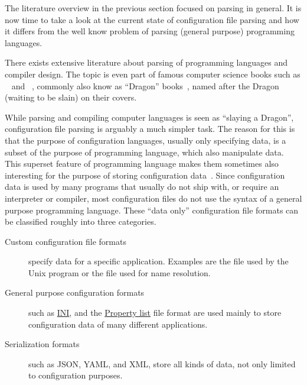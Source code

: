 The literature overview in the previous section focused on parsing in general. It is now time to take a look at the current state of configuration file parsing and how it differs from the well know problem of parsing (general purpose) programming languages.

There exists extensive literature about parsing of programming languages and compiler design. The topic is even part of famous computer science books such as ~\cite{ullman1977principles} and ~\cite{aho2006compilers}, commonly also know as “Dragon” books~\cite{parr2009language}, named after the Dragon (waiting to be slain) on their covers.

While parsing and compiling computer languages is seen as “slaying a Dragon”, configuration file parsing is arguably a much simpler task. The reason for this is that the purpose of configuration languages, usually only specifying data, is a subset of the purpose of programming language, which also manipulate data. This superset feature of programming language makes them sometimes also interesting for the purpose of storing configuration data~\cite{balmer2013lua}. Since configuration data is used by many programs that usually do not ship with, or require an interpreter or compiler, most configuration files do not use the syntax of a general purpose programming language. These “data only” configuration file formats can be classified roughly into three categories.

\begin{description}
  \item[Custom configuration file formats] specify data for a specific application. Examples are the \href{https://en.wikipedia.org/wiki/Fstab}{} file used by the Unix program  or the \href{https://en.wikipedia.org/wiki/https://en.wikipedia.org/wiki/Hosts_file}{} file used for name resolution.

  \item[General purpose configuration formats] such as \href{https://en.wikipedia.org/wiki/INI_file}{INI}, and the \href{https://en.wikipedia.org/wiki/Property_list}{Property list} file format are used mainly to store configuration data of many different applications.

  \item[Serialization formats] such as \gls{JSON}, \gls{YAML}, and \gls{XML}, store all kinds of data, not only limited to configuration purposes.
\end{description}

